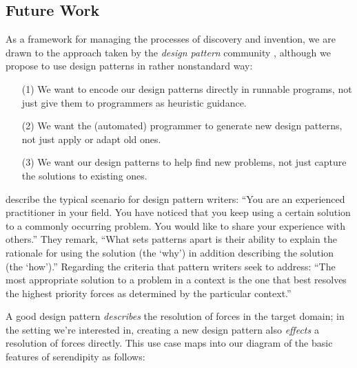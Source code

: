 \subsection{Future Work} \label{sec:futurework} \label{sec:hatching}

As a framework for managing the processes of discovery and invention,
we are drawn to the approach taken by the \emph{design pattern}
community \cite{alexander1999origins}, although we
propose to use design patterns in rather nonstandard way:
\begin{itemize}
\item[(1)] We want to encode our design patterns directly in runnable
  programs, not just give them to programmers as heuristic guidance.
\item[(2)] We want the (automated) programmer to generate new design
  patterns, not just apply or adapt old ones.
\item[(3)] We want our design patterns to help find new problems,
  not just capture the solutions to existing ones.
\end{itemize}

 describe the typical scenario for design
pattern writers: ``You are an experienced practitioner in your
field. You have noticed that you keep using a certain solution to a
commonly occurring problem. You would like to share your experience
with others.''  They remark, ``What sets patterns apart is their
ability to explain the rationale for using the solution (the `why') in
addition describing the solution (the `how').''  Regarding the
criteria that pattern writers seek to address: ``The most
appropriate solution to a problem in a context is the one that best
resolves the highest priority forces as determined by the particular
context.''  %

A good design pattern \emph{describes} the resolution of forces in the
target domain; in the setting we're interested in, creating a new
design pattern also \emph{effects} a resolution of forces directly.
This use case maps into our diagram of the basic features of serendipity as follows:



